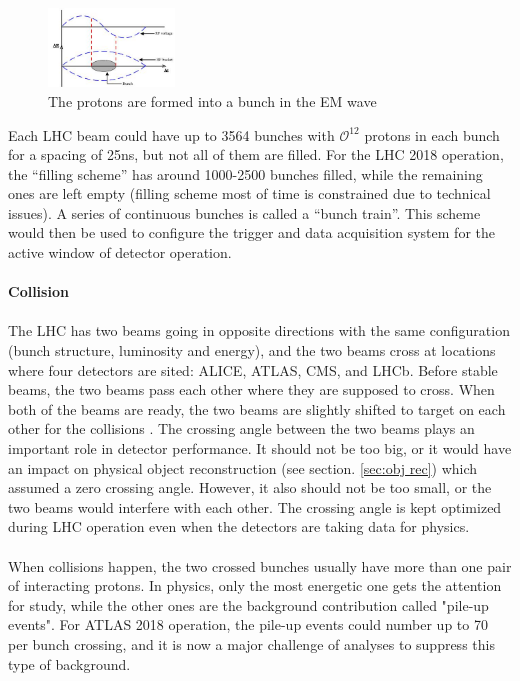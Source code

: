 \begin{figure}[!h]                
	\includegraphics[width=0.3\textwidth]{Chapter2/bunch.png}
	\centering
	\begin{center}
		\caption{The protons are formed into a bunch in the EM wave}
		\label{Fig:bunch}            
	\end{center}
\end{figure}
Each LHC beam could have up to 3564 bunches with $\mathcal{O}^{12}$ protons in each bunch for a spacing of 25ns, but not all of them are filled. For the LHC 2018 operation, the ``filling scheme''  has around 1000-2500 bunches filled, while the remaining ones are left empty (filling scheme most of time is constrained due to technical issues). A series of continuous bunches is called a ``bunch train''. This scheme would then be used to configure the trigger and data acquisition system for the active window of detector operation.
\\  
\\{\bf Collision}
\\
\\The LHC has two beams going in opposite directions with the same configuration (bunch structure, luminosity and energy), and the two beams cross at locations where four detectors are sited: ALICE, ATLAS, CMS, and LHCb. Before stable beams, the two beams pass each other where they are supposed to cross. When both of the beams are ready, the two beams are slightly shifted to target on each other for the collisions .  The crossing angle between the two beams plays an important role in detector performance. It should not be too big, or it would have an impact on physical object reconstruction (see section. \ref{sec:obj rec}) which assumed a zero crossing angle. However, it also should not be too small, or the two beams would interfere with each other. The crossing angle is kept optimized during LHC operation even when the detectors are taking data for physics.
\\
\\When collisions happen, the two crossed bunches usually have more than one pair of interacting protons. In physics, only the most energetic one gets the attention for study, while the other ones are the background contribution called "pile-up events". For ATLAS 2018 operation, the pile-up events could number up to 70 per bunch crossing, and it is now a major challenge of analyses to suppress this type of background.  

